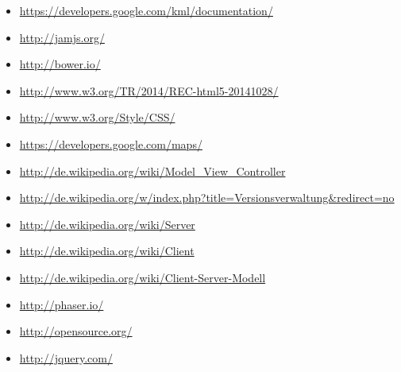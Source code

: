 \documentclass[11pt,a4paper]{article}
\begin{document}
\begin{itemize}
\item \url{https://developers.google.com/kml/documentation/}
\item \url{http://jamjs.org/}
\item \url{http://bower.io/}
\item \url{http://www.w3.org/TR/2014/REC-html5-20141028/}
\item \url{http://www.w3.org/Style/CSS/}
\item \url{https://developers.google.com/maps/}
\item \url{http://de.wikipedia.org/wiki/Model_View_Controller}
\item \url{http://de.wikipedia.org/w/index.php?title=Versionsverwaltung&redirect=no}
\item \url{http://de.wikipedia.org/wiki/Server}
\item \url{http://de.wikipedia.org/wiki/Client}
\item \url{http://de.wikipedia.org/wiki/Client-Server-Modell}
\item \url{http://phaser.io/}
\item \url{http://opensource.org/}
\item \url{http://jquery.com/}


\end{itemize}
\end{document}
